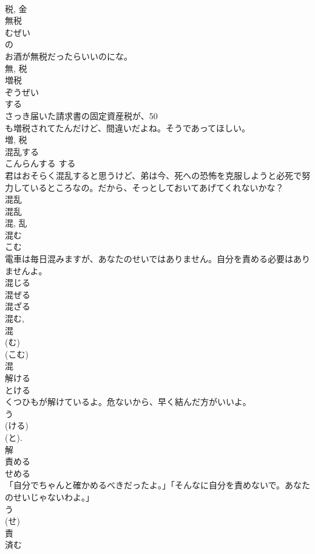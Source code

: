 \documentclass[8pt]{extreport}
\begin{document}
\begin{CJK}{UTF8}{min}
\\	税, 金	
\\	無税	
\\	むぜい	
\\	の 
\\	お酒が無税だったらいいのにな。	
\\	無, 税	
\\	増税	
\\	ぞうぜい	
\\	する 
\\	さっき届いた請求書の固定資産税が、50
\\	も増税されてたんだけど、間違いだよね。そうであってほしい。	
\\	増, 税	
\\	混乱する	
\\	こんらんする	する 
\\	君はおそらく混乱すると思うけど、弟は今、死への恐怖を克服しようと必死で努力しているところなの。だから、そっとしておいてあげてくれないかな？	
\\	混乱 
\\	混乱 
\\	混, 乱	
\\	混む	
\\	こむ	
\\	電車は毎日混みますが、あなたのせいではありません。自分を責める必要はありませんよ。	
\\	混じる 
\\	混ぜる 
\\	混ざる 
\\	混む, 
\\	混 
\\	(む) 
\\	(こむ) 
\\	混	
\\	解ける	
\\	とける	
\\	くつひもが解けているよ。危ないから、早く結んだ方がいいよ。	
\\	う 
\\	(ける) 
\\	(と). 
\\	解	
\\	責める	
\\	せめる	
\\	「自分でちゃんと確かめるべきだったよ。」「そんなに自分を責めないで。あなたのせいじゃないわよ。」	
\\	う 
\\	(せ) 
\\	責	
\\	済む	

\end{CJK}
\end{document}
